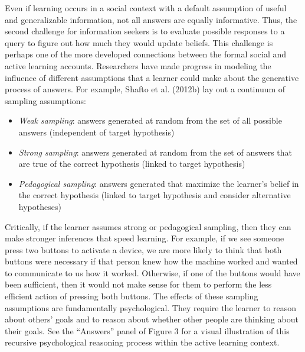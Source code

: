 \documentclass[oneside]{report}
\begin{document}
Even if learning occurs in a social context with a default assumption of
useful and generalizable information, not all answers are equally
informative. Thus, the second challenge for information seekers is to
evaluate possible responses to a query to figure out how much they would
update beliefs. This challenge is perhaps one of the more developed
connections between the formal social and active learning accounts.
Researchers have made progress in modeling the influence of different
assumptions that a learner could make about the generative process of
answers. For example, Shafto et al. (2012b) lay out a continuum of
sampling assumptions:
\begin{itemize}
\tightlist
\item
  \emph{Weak sampling}: answers generated at random from the set of all
  possible answers (independent of target hypothesis)
\item
  \emph{Strong sampling}: answers generated at random from the set of
  answers that are true of the correct hypothesis (linked to target
  hypothesis)
\item
  \emph{Pedagogical sampling}: answers generated that maximize the
  learner's belief in the correct hypothesis (linked to target
  hypothesis and consider alternative hypotheses)
\end{itemize}
\noindent Critically, if the learner assumes strong or pedagogical
sampling, then they can make stronger inferences that speed learning.
For example, if we see someone press two buttons to activate a device,
we are more likely to think that both buttons were necessary if that
person knew how the machine worked and wanted to communicate to us how
it worked. Otherwise, if one of the buttons would have been sufficient,
then it would not make sense for them to perform the less efficient
action of pressing both buttons. The effects of these sampling
assumptions are fundamentally psychological. They require the learner to
reason about others' goals and to reason about whether other people are
thinking about their goals. See the ``Answers'' panel of Figure 3 for a
visual illustration of this recursive psychological reasoning process
within the active learning context.
\end{document}
